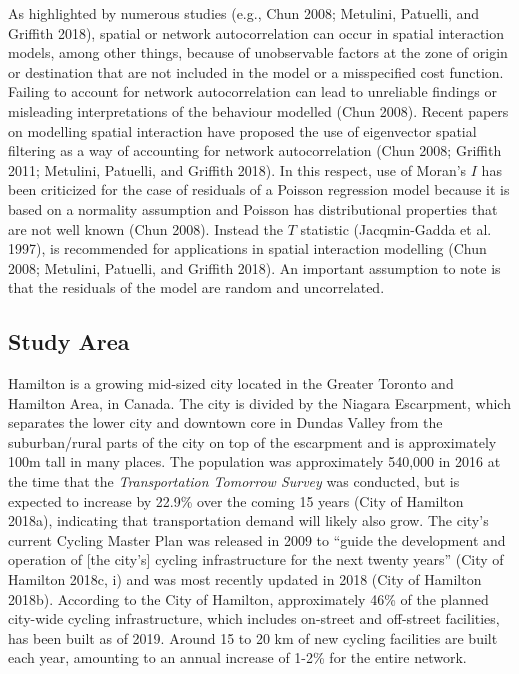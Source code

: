 \documentclass[smallextended]{svjour3}       %
\begin{document}
As highlighted by numerous studies (e.g., Chun 2008; Metulini, Patuelli,
and Griffith 2018), spatial or network autocorrelation can occur in
spatial interaction models, among other things, because of unobservable
factors at the zone of origin or destination that are not included in
the model or a misspecified cost function. Failing to account for
network autocorrelation can lead to unreliable findings or misleading
interpretations of the behaviour modelled (Chun 2008). Recent papers on
modelling spatial interaction have proposed the use of eigenvector
spatial filtering as a way of accounting for network autocorrelation
(Chun 2008; Griffith 2011; Metulini, Patuelli, and Griffith 2018). In
this respect, use of Moran's \(I\) has been criticized for the case of
residuals of a Poisson regression model because it is based on a
normality assumption and Poisson has distributional properties that are
not well known (Chun 2008). Instead the \(T\) statistic (Jacqmin-Gadda
et al. 1997), is recommended for applications in spatial interaction
modelling (Chun 2008; Metulini, Patuelli, and Griffith 2018). An
important assumption to note is that the residuals of the model are
random and uncorrelated.

\hypertarget{study-area}{%
\subsection{Study Area}\label{study-area}}

Hamilton is a growing mid-sized city located in the Greater Toronto and
Hamilton Area, in Canada. The city is divided by the Niagara Escarpment,
which separates the lower city and downtown core in Dundas Valley from
the suburban/rural parts of the city on top of the escarpment and is
approximately 100m tall in many places. The population was approximately
540,000 in 2016 at the time that the \emph{Transportation Tomorrow
Survey} was conducted, but is expected to increase by 22.9\% over the
coming 15 years (City of Hamilton 2018a), indicating that transportation
demand will likely also grow. The city's current Cycling Master Plan was
released in 2009 to ``guide the development and operation of {[}the
city's{]} cycling infrastructure for the next twenty years'' (City of
Hamilton 2018c, i) and was most recently updated in 2018 (City of
Hamilton 2018b). According to the City of Hamilton, approximately 46\%
of the planned city-wide cycling infrastructure, which includes
on-street and off-street facilities, has been built as of 2019. Around
15 to 20 km of new cycling facilities are built each year, amounting to
an annual increase of 1-2\% for the entire network.
\end{document}
